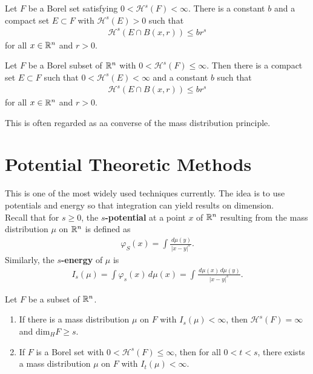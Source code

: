 \documentclass{memoir}
\begin{document}
\begin{prop}
	Let \(F\) be a Borel set satisfying \(0<\mathcal{H}^{s}(F) < \infty\). There is a constant \(b\) and a compact set \(E\subset F\) with \(\mathcal{H}^{s}(E) > 0\) such that
	\begin{align*}
		\mathcal{H}^{s}(E \cap B(x,r)) \leq br^{s}
	\end{align*}
	for all \(x \in \mathbb{R}^{n}\) and \(r>0\).
\end{prop}

\begin{cor}
	Let \(F\) be a Borel subset of \(\mathbb{R}^{n}\) with \(0<\mathcal{H}^{s}(F) \leq \infty\). Then there is a compact set \(E\subset F\) such that \(0<\mathcal{H}^{s}(E) < \infty\) and a constant \(b\) such that
	\begin{align*}
		\mathcal{H}^{s}(E\cap B(x,r)) \leq br^{s}
	\end{align*}
	for all \(x \in \mathbb{R}^{n}\) and \(r>0\).
\end{cor}
This is often regarded as aa converse of the mass distribution principle.

\section{Potential Theoretic Methods}
\label{sec:potential_theoretic_methods}

This is one of the most widely used techniques currently. The idea is to use potentials and energy so that integration can yield results on dimension.\\

Recall that for \(s\geq 0\), the \textbf{\(s\)-potential} at a point \(x\) of \(\mathbb{R}^{n}\) resulting from the mass distribution \(\mu \) on \(\mathbb{R}^{n}\) is defined as
\begin{align*}
	\varphi_S(x) = \int \frac{\,d \mu (y)}{\left| x-y \right|^{s}}.
\end{align*}
Similarly, the \textbf{\(s\)-energy} of \(\mu \) is
\begin{align*}
	I_s(\mu ) = \int \varphi_s(x) \,d \mu (x) = \int \frac{\,d \mu (x)\,d \mu (y)}{\left| x-y \right|^{s}}.
\end{align*}

\begin{thm}
	Let \(F\) be a subset of \(\mathbb{R}^{n}\).
	\begin{enumerate}
		\item If there is a mass distribution \(\mu \) on \(F\) with \(I_s(\mu )<\infty\), then \(\mathcal{H}^{s}(F) = \infty\) and \(\textrm{dim}_H F \geq s\).
		\item If \(F\) is a Borel set with \(0<\mathcal{H}^{s}(F) \leq \infty\), then for all \(0<t<s\), there exists a mass distribution \(\mu \) on \(F\) with \(I_t(\mu )<\infty\).
	\end{enumerate}
\end{thm}
\end{document}
